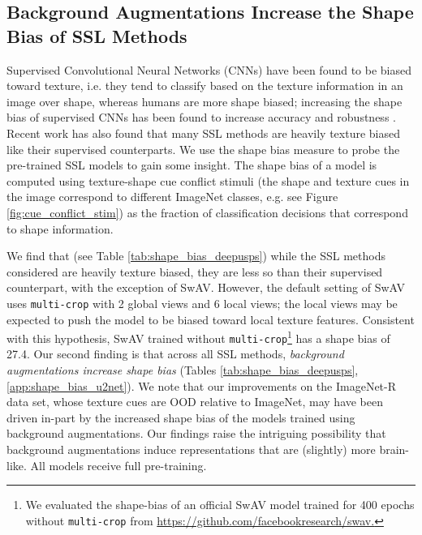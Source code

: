 \documentclass[twoside,11pt]{article}
\begin{document}
\subsection{Background Augmentations Increase the Shape Bias of SSL Methods}
\label{sec:shape_bias}

Supervised Convolutional Neural Networks (CNNs) have been found to be biased toward texture, i.e. they tend to classify based on the texture information in an image over shape, whereas humans are more shape biased; increasing the shape bias of supervised CNNs has been found to increase accuracy and robustness \citep{geirhos2019imagenettrained}. Recent work \citep{geirhos2020surprising} has also found that many SSL methods are heavily texture biased like their supervised counterparts. We use the shape bias measure \citep{geirhos2019imagenettrained} to probe the pre-trained SSL models to gain some insight. The shape bias of a model is computed using texture-shape cue conflict stimuli (the shape and texture cues in the image correspond to different ImageNet classes, e.g. see Figure \ref{fig:cue_conflict_stim}) as the fraction of classification decisions that correspond to shape information. 


We find that (see Table \ref{tab:shape_bias_deepusps}) while the SSL methods considered are heavily texture biased, they are less so than their supervised counterpart, with the exception of SwAV. However, the default setting of SwAV uses \texttt{multi-crop} with 2 global views and 6 local views; the local views may be expected to push the model to be biased toward local texture features. Consistent with this hypothesis, SwAV trained without \texttt{multi-crop}\footnote{We evaluated the shape-bias of an official SwAV model trained for 400 epochs without \texttt{multi-crop} from \url{https://github.com/facebookresearch/swav.}} has a shape bias of 27.4. Our second finding is that across all SSL methods, \textit{background augmentations increase shape bias} (Tables \ref{tab:shape_bias_deepusps}, \ref{app:shape_bias_u2net}). We note that our improvements on the ImageNet-R data set, whose texture cues are OOD relative to ImageNet, may have been driven in-part by the increased shape bias of the models trained using background augmentations. Our findings raise the intriguing possibility that background augmentations induce representations that are (slightly) more brain-like. All models receive full pre-training.
\end{document}
